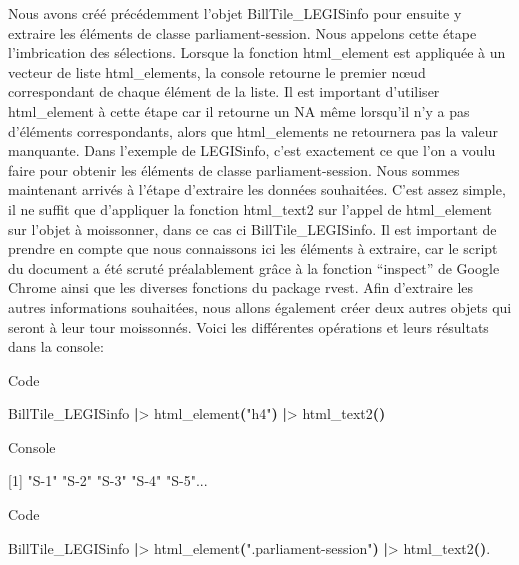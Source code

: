 \documentclass[
  letterpaper,
  DIV=11,
  numbers=noendperiod]{scrreprt}
\newenvironment{Shaded}{\begin{snugshade}}{\end{snugshade}}
\newcommand{\BuiltInTok}[1]{\textcolor[rgb]{0.00,0.23,0.31}{#1}}
\newcommand{\ExtensionTok}[1]{\textcolor[rgb]{0.00,0.23,0.31}{#1}}
\newcommand{\KeywordTok}[1]{\textcolor[rgb]{0.00,0.23,0.31}{\textbf{#1}}}
\newcommand{\NormalTok}[1]{\textcolor[rgb]{0.00,0.23,0.31}{#1}}
\newcommand{\OperatorTok}[1]{\textcolor[rgb]{0.37,0.37,0.37}{#1}}
\newcommand{\StringTok}[1]{\textcolor[rgb]{0.13,0.47,0.30}{#1}}
\begin{document}
Nous avons créé précédemment l'objet BillTile\_LEGISinfo pour ensuite y
extraire les éléments de classe parliament-session. Nous appelons cette
étape l'imbrication des sélections. Lorsque la fonction html\_element
est appliquée à un vecteur de liste html\_elements, la console retourne
le premier nœud correspondant de chaque élément de la liste. Il est
important d'utiliser html\_element à cette étape car il retourne un NA
même lorsqu'il n'y a pas d'éléments correspondants, alors que
html\_elements ne retournera pas la valeur manquante. Dans l'exemple de
LEGISinfo, c'est exactement ce que l'on a voulu faire pour obtenir les
éléments de classe parliament-session. Nous sommes maintenant arrivés à
l'étape d'extraire les données souhaitées. C'est assez simple, il ne
suffit que d'appliquer la fonction html\_text2 sur l'appel de
html\_element sur l'objet à moissonner, dans ce cas ci
BillTile\_LEGISinfo. Il est important de prendre en compte que nous
connaissons ici les éléments à extraire, car le script du document a été
scruté préalablement grâce à la fonction ``inspect'' de Google Chrome
ainsi que les diverses fonctions du package rvest. Afin d'extraire les
autres informations souhaitées, nous allons également créer deux autres
objets qui seront à leur tour moissonnés. Voici les différentes
opérations et leurs résultats dans la console:

Code

\begin{Shaded}
\begin{Highlighting}[]
\ExtensionTok{BillTile\_LEGISinfo} \KeywordTok{|}\OperatorTok{\textgreater{}}\NormalTok{ html\_element}\KeywordTok{(}\StringTok{"h4"}\KeywordTok{)} \KeywordTok{|}\OperatorTok{\textgreater{}}\NormalTok{ html\_text2}\KeywordTok{()}
\end{Highlighting}
\end{Shaded}

Console

\begin{Shaded}
\begin{Highlighting}[]
\ExtensionTok{[1]} \StringTok{"S{-}1"}   \StringTok{"S{-}2"}   \StringTok{"S{-}3"}   \StringTok{"S{-}4"}   \StringTok{"S{-}5"}\NormalTok{...}
\end{Highlighting}
\end{Shaded}

Code

\begin{Shaded}
\begin{Highlighting}[]
\ExtensionTok{BillTile\_LEGISinfo} \KeywordTok{|}\OperatorTok{\textgreater{}}\NormalTok{ html\_element}\KeywordTok{(}\StringTok{".parliament{-}session"}\KeywordTok{)} \KeywordTok{|}\OperatorTok{\textgreater{}}\NormalTok{ html\_text2}\KeywordTok{()}\BuiltInTok{.}
\end{Highlighting}
\end{Shaded}
\end{document}
